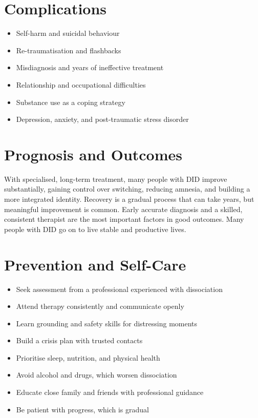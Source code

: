 \section*{Complications}
\begin{itemize}
    \item Self-harm and suicidal behaviour
    \item Re-traumatisation and flashbacks
    \item Misdiagnosis and years of ineffective treatment
    \item Relationship and occupational difficulties
    \item Substance use as a coping strategy
    \item Depression, anxiety, and post-traumatic stress disorder
\end{itemize}

\section*{Prognosis and Outcomes}
With specialised, long-term treatment, many people with DID improve substantially, gaining control over switching, reducing amnesia, and building a more integrated identity. Recovery is a gradual process that can take years, but meaningful improvement is common. Early accurate diagnosis and a skilled, consistent therapist are the most important factors in good outcomes. Many people with DID go on to live stable and productive lives.

\section*{Prevention and Self-Care}
\begin{itemize}
    \item Seek assessment from a professional experienced with dissociation
    \item Attend therapy consistently and communicate openly
    \item Learn grounding and safety skills for distressing moments
    \item Build a crisis plan with trusted contacts
    \item Prioritise sleep, nutrition, and physical health
    \item Avoid alcohol and drugs, which worsen dissociation
    \item Educate close family and friends with professional guidance
    \item Be patient with progress, which is gradual
\end{itemize}

